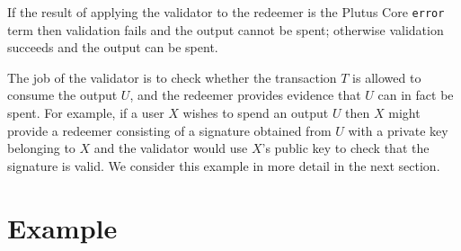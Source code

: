 \documentclass[a4paper]{article}
\begin{document}
If the result of applying
the validator to the redeemer is the Plutus Core \texttt{error} term
then validation fails and the output cannot be spent; otherwise
validation succeeds and the output can be spent.

The job of the validator is to check whether the transaction $T$ is
allowed to consume the output $U$, and the redeemer provides evidence
that $U$ can in fact be spent.  For example, if a user $X$ wishes to
spend an output $U$ then $X$ might provide a redeemer consisting of a
signature obtained from $U$ with a private key belonging to $X$ and
the validator would use $X$'s public key to check that the signature
is valid.  We consider this example in more detail in the next
section.

\section{Example}





%

%

%


%
\end{document}
